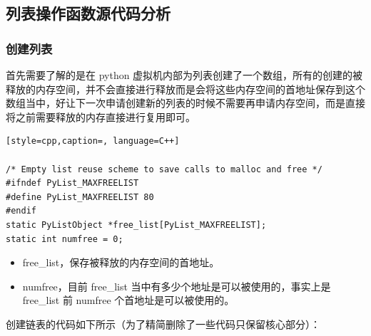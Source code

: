 \subsection{列表操作函数源代码分析}
\subsubsection{创建列表}
首先需要了解的是在 python 虚拟机内部为列表创建了一个数组，所有的创建的被释放的内存空间，并不会直接进行释放而是会将这些内存空间的首地址保存到这个数组当中，好让下一次申请创建新的列表的时候不需要再申请内存空间，而是直接将之前需要释放的内存直接进行复用即可。
\begin{lstlisting}[style=cpp,caption=, language=C++]

/* Empty list reuse scheme to save calls to malloc and free */
#ifndef PyList_MAXFREELIST
#define PyList_MAXFREELIST 80
#endif
static PyListObject *free_list[PyList_MAXFREELIST];
static int numfree = 0;
\end{lstlisting}
\begin{itemize}
\item free\_list，保存被释放的内存空间的首地址。 
\item numfree，目前 free\_list 当中有多少个地址是可以被使用的，事实上是 free\_list 前 numfree 个首地址是可以被使用的。 
\end{itemize}
创建链表的代码如下所示（为了精简删除了一些代码只保留核心部分）：
